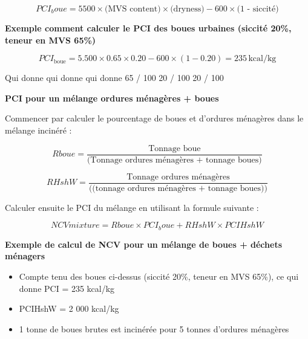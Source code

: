 \[
PCI_boue = 5 500 \times \text{(MVS content)} \times \text{(dryness)} - 600 \times \text{(1 - siccité)}
\]


\vspace{0.3cm}
\textbf{Exemple comment calculer le PCI des boues urbaines
(siccité 20\%, teneur en MVS 65\%)}
\vspace{0.3cm}


\begin{equation}
    PCI_{\text{boue}} = 5.500 \times 0.65 \times 0.20 - 600 \times (1 - 0.20) = 235 \, \text{kcal/kg}
\end{equation}


		
		Qui donne	qui donne	qui donne
		65 / 100	20 / 100	20 / 100



\vspace{0.3cm}
\textbf{PCI pour un mélange ordures ménagères + boues}
\vspace{0.3cm}

Commencer par calculer le pourcentage de boues et d'ordures ménagères dans le mélange incinéré :

\[
Rboue = \frac{\text{Tonnage boue}}{\text{(Tonnage ordures ménagères + tonnage boues)}}
\]

\[
RHshW = \frac{\text{Tonnage ordures ménagères}}{\text{((tonnage ordures ménagères + tonnage boues))}}
\]

Calculer ensuite le PCI du mélange en utilisant la formule suivante :

\[
NCVmixture = Rboue \times PCI_boue + RHshW \times PCIHshW
\]

\vspace{0.3cm}
\textbf{Exemple de calcul de NCV pour un mélange de boues + déchets ménagers}
\vspace{0.3cm}

\begin{itemize}

 \item  Compte tenu des boues ci-dessus (siccité 20\%, teneur en MVS 65\%), ce qui donne PCI = 235 kcal/kg
 \item  PCIHshW = 2 000 kcal/kg
 \item  1 tonne de boues brutes est incinérée pour 5 tonnes d'ordures ménagères
   
\end{itemize}



